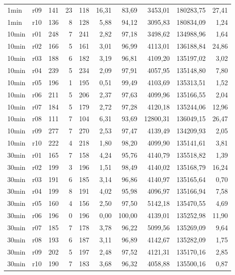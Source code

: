 \begin{longtable}{llrrrrrrrr}
1min & r09 & 141 & 23 & 118 & 16,31 & 83,69 & 3453,01 & 180283,75 & 27,41 \\
1min & r10 & 136 & 8 & 128 & 5,88 & 94,12 & 3095,83 & 180834,09 & 1,24 \\
10min & r01 & 248 & 7 & 241 & 2,82 & 97,18 & 3498,62 & 134988,96 & 1,64 \\
10min & r02 & 166 & 5 & 161 & 3,01 & 96,99 & 4113,01 & 136188,84 & 24,86 \\
10min & r03 & 188 & 6 & 182 & 3,19 & 96,81 & 4109,20 & 135197,02 & 3,02 \\
10min & r04 & 239 & 5 & 234 & 2,09 & 97,91 & 4057,95 & 135148,80 & 7,80 \\
10min & r05 & 196 & 1 & 195 & 0,51 & 99,49 & 4103,69 & 135313,51 & 1,52 \\
10min & r06 & 211 & 5 & 206 & 2,37 & 97,63 & 4099,96 & 135166,55 & 2,04 \\
10min & r07 & 184 & 5 & 179 & 2,72 & 97,28 & 4120,18 & 135244,06 & 12,96 \\
10min & r08 & 111 & 7 & 104 & 6,31 & 93,69 & 12800,31 & 136049,15 & 26,47 \\
10min & r09 & 277 & 7 & 270 & 2,53 & 97,47 & 4139,49 & 134209,93 & 2,05 \\
10min & r10 & 222 & 4 & 218 & 1,80 & 98,20 & 4099,90 & 135141,61 & 3,81 \\
30min & r01 & 165 & 7 & 158 & 4,24 & 95,76 & 4140,79 & 135518,82 & 1,39 \\
30min & r02 & 199 & 3 & 196 & 1,51 & 98,49 & 4140,02 & 135168,79 & 16,24 \\
30min & r03 & 191 & 6 & 185 & 3,14 & 96,86 & 4140,97 & 135165,64 & 0,70 \\
30min & r04 & 199 & 8 & 191 & 4,02 & 95,98 & 4096,97 & 135166,94 & 7,58 \\
30min & r05 & 160 & 4 & 156 & 2,50 & 97,50 & 5142,18 & 135470,55 & 4,69 \\
30min & r06 & 196 & 0 & 196 & 0,00 & 100,00 & 4139,01 & 135252,98 & 11,90 \\
30min & r07 & 185 & 7 & 178 & 3,78 & 96,22 & 5099,56 & 135269,09 & 9,64 \\
30min & r08 & 193 & 6 & 187 & 3,11 & 96,89 & 4142,67 & 135282,09 & 1,75 \\
30min & r09 & 202 & 5 & 197 & 2,48 & 97,52 & 4121,31 & 135170,16 & 2,85 \\
30min & r10 & 190 & 7 & 183 & 3,68 & 96,32 & 4058,88 & 135500,16 & 0,87 \\
\bottomrule
\end{longtable}
